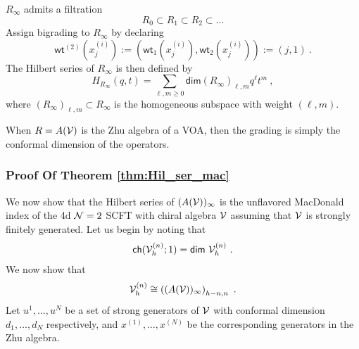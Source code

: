 \documentclass[a4paper,10pt]{article}
\newcommand{\mr}[1]{\mathsf{#1}}
\newcommand{\tsf}[1]{\textsf{#1}}
\def\CN {{\cal N}}
\def\CV {{\cal V}}
\begin{document}
$R_\infty$ admits a filtration
\begin{equation}
R_0\subset R_1\subset R_2\subset\dots    
\end{equation}
Assign bigrading to $R_\infty$ by declaring 
\begin{equation}\label{eq:wt_arc_space_var}
    \mr{wt}^{(2)}(x_j^{(i)}):=\left(\mr{wt}_1(x_j^{(i)}),\mr{wt}_2(x_j^{(i)})\right):=(j,1)~.
\end{equation}
The Hilbert series of $R_\infty$ is then defined by 
\begin{equation}\label{eq:Hilber_ser_def}
H_{R_\infty}(q,t)=\sum_{\ell,m\geq 0} \mathsf{dim}(R_\infty)_{\ell,m}q^\ell t^m~,    
\end{equation}
where $(R_\infty)_{\ell,m}\subset R_\infty$ is the homogeneous subspace with weight $(\ell,m)$.

When $R=A(\CV)$ is the Zhu algebra of a \tsf{VOA}, then the grading is simply the conformal dimension of the operators. 
\subsubsection{Proof Of Theorem \ref{thm:Hil_ser_mac}}
We now show that the Hilbert series of $(A(\CV))_\infty$ is the unflavored MacDonald index of the 4d $\CN=2$ \tsf{SCFT} with chiral algebra $\CV$ assuming that $\CV$ is strongly finitely generated. Let us begin by noting that 
\begin{equation}
    \mr{ch}(\CV^{(n)}_h;1)=\mr{dim}~\CV^{(n)}_h~.
\end{equation}
We now show that 
\begin{equation}\label{eq:hom_space_voa_arc_iso}
\CV^{(n)}_h\cong  \left((A(\CV))_\infty\right)_{h-n,n}~.   
\end{equation}
Let $u^1,\dots,u^N$ be a set of strong generators of $\CV$ with conformal dimension $d_1,\dots,d_N$ respectively, and $x^{(1)},\dots,x^{(N)}$ be the corresponding generators in the Zhu algebra. 
\end{document}
